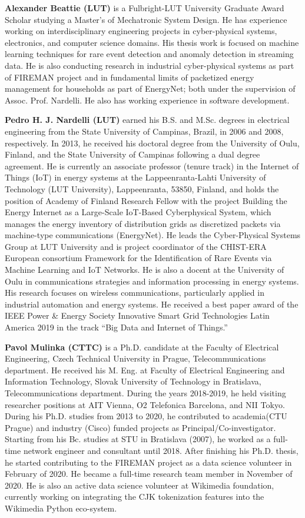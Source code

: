 \textbf{Alexander Beattie (LUT)} is a Fulbright-LUT University Graduate Award Scholar studying a Master’s of Mechatronic System Design. He has experience working on interdisciplinary engineering projects in cyber-physical systems, electronics, and computer science domains. His thesis work is focused on machine learning techniques for rare event detection and anomaly detection in streaming data. He is also conducting research in industrial cyber-physical systems as part of FIREMAN project and in fundamental limits of packetized energy management for households as part of EnergyNet; both under the supervision of Assoc. Prof. Nardelli. He also has working experience in software development. 

\textbf{Pedro H. J. Nardelli (LUT)} earned his B.S. and M.Sc. degrees in electrical engineering from the State University of Campinas, Brazil, in 2006 and 2008, respectively. In 2013, he received his doctoral degree from the University of Oulu, Finland, and the State University of Campinas following a dual degree agreement. He is currently an associate professor (tenure track) in the Internet of Things (IoT) in energy systems at the Lappeenranta-Lahti University of Technology (LUT University), Lappeenranta, 53850, Finland, and holds the position of Academy of Finland Research Fellow with the project Building the Energy Internet as a Large-Scale IoT-Based Cyberphysical System, which manages the energy inventory of distribution grids as discretized packets via machine-type communications (EnergyNet). He leads the Cyber-Physical Systems Group at LUT University and is project coordinator of the CHIST-ERA European consortium Framework for the Identification of Rare Events via Machine Learning and IoT Networks. He is also a docent at the University of Oulu in communications strategies and information processing in energy systems. His research focuses on wireless communications, particularly applied in industrial automation and energy systems. He received a best paper award of the IEEE Power \& Energy Society Innovative Smart Grid Technologies Latin America 2019 in the track “Big Data and Internet of Things.”

\textbf{Pavol Mulinka (CTTC)} is a Ph.D. candidate at the Faculty of Electrical Engineering, Czech Technical University in Prague, Telecommunications department. He received his M. Eng. at Faculty of Electrical Engineering and Information Technology, Slovak University of Technology in Bratislava, Telecommunications department. During the years 2018-2019, he held visiting researcher positions at AIT Vienna, O2 Telefonica Barcelona, and NII Tokyo. During his Ph.D. studies from 2013 to 2020, he contributed to academia(CTU Prague) and industry (Cisco) funded projects as Principal/Co-investigator. Starting from his Bc. studies at STU in Bratislava (2007), he worked as a full-time network engineer and consultant until 2018. After finishing his Ph.D. thesis, he started contributing to the FIREMAN project as a data science volunteer in February of 2020. He became a full-time research team member in November of 2020. He is also an active data science volunteer at Wikimedia foundation, currently working on integrating the CJK tokenization features into the Wikimedia Python eco-system.

